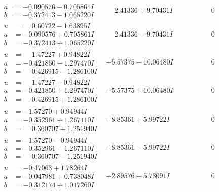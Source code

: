 \documentclass[1p]{elsarticle_modified}
\theoremstyle{definition}
\begin{document}
$$\begin{array}{c|c|c}
\begin{aligned}
a &= -0.090576 - 0.705861 I \\
b &= -0.372413 - 1.065220 I\end{aligned}
 & \phantom{-}2.41336 + 9.70431 I & \phantom{-0.000000 } 0 \\ \hline\begin{aligned}
u &= \phantom{-}0.60722 - 1.63895 I \\
a &= -0.090576 + 0.705861 I \\
b &= -0.372413 + 1.065220 I\end{aligned}
 & \phantom{-}2.41336 - 9.70431 I & \phantom{-0.000000 } 0 \\ \hline\begin{aligned}
u &= \phantom{-}1.47227 + 0.94822 I \\
a &= -0.421850 - 1.297470 I \\
b &= \phantom{-}0.426915 - 1.286100 I\end{aligned}
 & -5.57375 - 10.06480 I & \phantom{-0.000000 } 0 \\ \hline\begin{aligned}
u &= \phantom{-}1.47227 - 0.94822 I \\
a &= -0.421850 + 1.297470 I \\
b &= \phantom{-}0.426915 + 1.286100 I\end{aligned}
 & -5.57375 + 10.06480 I & \phantom{-0.000000 } 0 \\ \hline\begin{aligned}
u &= -1.57270 + 0.94944 I \\
a &= -0.352961 + 1.267110 I \\
b &= \phantom{-}0.360707 + 1.251940 I\end{aligned}
 & -8.85361 + 5.99722 I & \phantom{-0.000000 } 0 \\ \hline\begin{aligned}
u &= -1.57270 - 0.94944 I \\
a &= -0.352961 - 1.267110 I \\
b &= \phantom{-}0.360707 - 1.251940 I\end{aligned}
 & -8.85361 - 5.99722 I & \phantom{-0.000000 } 0 \\ \hline\begin{aligned}
u &= -0.47063 + 1.78264 I \\
a &= -0.047981 + 0.738048 I \\
b &= -0.312174 + 1.017260 I\end{aligned}
 & -2.89576 - 5.73091 I & \phantom{-0.000000 } 0 \\ \hline\begin{aligned}

\end{aligned}
\end{array}$$
\end{document}
